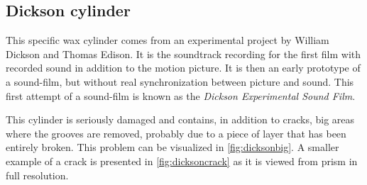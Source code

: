 \subsection{Dickson cylinder}

This specific wax cylinder comes from an experimental project by William Dickson and Thomas Edison. It is the soundtrack recording for the first film with recorded sound in addition to the motion picture. It is then an early prototype of a sound-film, but without real synchronization between picture and sound. This first attempt of a sound-film is known as the \emph{Dickson Experimental Sound Film}.

This cylinder is seriously damaged and contains, in addition to cracks, big areas where the grooves are removed, probably due to a piece of layer that has been entirely broken. This problem can be visualized in \autoref{fig:dicksonbig}. A smaller example of a crack is presented in \autoref{fig:dicksoncrack} as it is viewed from \gls{prism} in full resolution.

